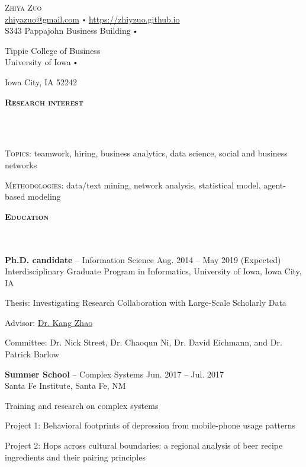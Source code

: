 \documentclass{article}
\newcommand{\contact}[3]{
\vspace*{5pt}
\begin{center}
{\LARGE \scshape {#1}}\\
\vspace{3pt}
#2 
\vspace{2pt}
#3
\end{center}
\vspace*{-8pt}
}
\newcommand{\header}[1]{{
\hspace*{-15pt}\vspace*{6pt} \textbf{\textsc{\large{#1}}}} \vspace*{-6pt} 
\lineunder
}
\newcommand{\lineunder}{
\vspace*{-8pt} \\ \hspace*{-15pt} 
\hrulefill \\
}
\newcommand{\employer}[4]{{
\vspace*{2pt}%
\textbf{#1} #2 \hfill #3\\ #4 \vspace*{2pt}}
}
\renewcommand{\labelitemi}{
$\vcenter{\hbox{\tiny$\bullet$}}$\hspace*{3pt}
}
\renewcommand{\labelitemii}{
$\vcenter{\hbox{\tiny$\bullet$}}$\hspace*{-3pt}
}
\newenvironment{bullet-list-major}{
\begin{list}{\labelitemii}{\setlength\leftmargin{3pt} 
\topsep 0pt \itemsep -2pt}}{\vspace*{4pt}\end{list}
}
\newenvironment{bullet-list-minor}{
\begin{list}{\labelitemii}{\setlength\leftmargin{15pt} 
\topsep 0pt \itemsep -2pt}}{\vspace*{4pt}\end{list}
}
\begin{document}
\small
\smallskip
\vspace*{-44pt}

\contact{Zhiya Zuo}
{\href{mailto:zhiyazuo@gmail.com}{zhiyazuo@gmail.com} \labelitemi \href{https://zhiyzuo.github.io}{https://zhiyzuo.github.io}\\}
{S343 Pappajohn Business Building \labelitemi
 Tippie College of Business \\
 University of Iowa \labelitemi
 Iowa City, IA 52242\\%
}

\vspace{15pt}
\header{Research interest}
\begin{bullet-list-major}
    \item \textsc{Topics}: teamwork, hiring, business analytics, data science, social and business networks
    \item \textsc{Methodologies}: data/text mining, network analysis, statistical model, agent-based modeling
\end{bullet-list-major}

\vspace*{4pt}%
\header{Education}
    \employer{Ph.D. candidate}{-- Information Science}{Aug. 2014 -- May 2019 (Expected)}{Interdisciplinary Graduate Program in Informatics, University of Iowa, Iowa City, IA}
	\begin{bullet-list-minor}
    	\item Thesis: Investigating Research Collaboration with Large-Scale Scholarly Data
        \item Advisor: \href{www.kangzhao.net}{Dr. Kang Zhao}
        \item Committee: Dr. Nick Street, Dr. Chaoqun Ni, Dr. David Eichmann, and Dr. Patrick Barlow
    \end{bullet-list-minor}
    
    \employer{Summer School}{-- Complex Systems}{Jun. 2017 -- Jul. 2017}{Santa Fe Institute, Santa Fe, NM}
	\begin{bullet-list-minor}
    	\item Training and research on complex systems
        \item Project 1: Behavioral footprints of depression from mobile-phone usage patterns 
        \item Project 2: Hops across cultural boundaries: a regional analysis of beer recipe ingredients and their pairing principles
    \end{bullet-list-minor}
    
\end{document}
